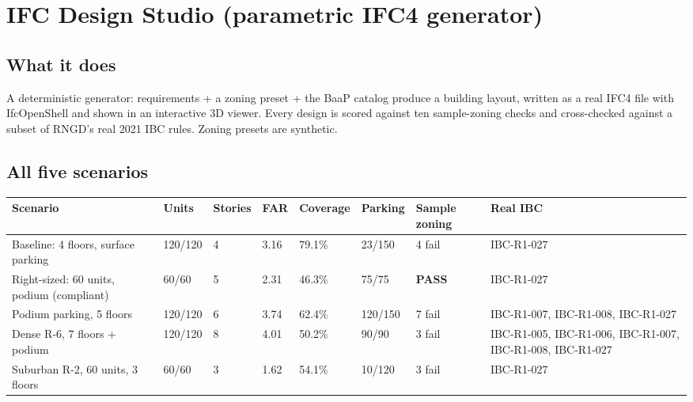 \documentclass[10pt]{article}
\begin{document}
\section{IFC Design Studio (parametric IFC4 generator)}
\subsection{What it does}
A deterministic generator: requirements + a zoning preset + the BaaP catalog produce a building layout, written as a
real IFC4 file with IfcOpenShell and shown in an interactive 3D viewer. Every design is scored against ten
sample-zoning checks and cross-checked against a subset of RNGD's real 2021 IBC rules. Zoning presets are synthetic.

\subsection{All five scenarios}
{\small \begin{longtable}{p{4.4cm}p{1.2cm}p{1.0cm}p{0.8cm}p{1.3cm}p{1.4cm}p{1.8cm}p{2.6cm}}
\toprule
\textbf{Scenario} & \textbf{Units} & \textbf{Stories} & \textbf{FAR} & \textbf{Coverage} & \textbf{Parking} & \textbf{Sample zoning} & \textbf{Real IBC} \\ \midrule \endhead
Baseline: 4 floors, surface parking & 120/120 & 4 & 3.16 & 79.1\% & 23/150 & \textcolor{fail}{4 fail} & \textcolor{fail}{IBC-R1-027} \\
Right-sized: 60 units, podium (compliant) & 60/60 & 5 & 2.31 & 46.3\% & 75/75 & \textcolor{pass}{\textbf{PASS}} & \textcolor{fail}{IBC-R1-027} \\
Podium parking, 5 floors & 120/120 & 6 & 3.74 & 62.4\% & 120/150 & \textcolor{fail}{7 fail} & \textcolor{fail}{IBC-R1-007, IBC-R1-008, IBC-R1-027} \\
Dense R-6, 7 floors + podium & 120/120 & 8 & 4.01 & 50.2\% & 90/90 & \textcolor{fail}{3 fail} & \textcolor{fail}{IBC-R1-005, IBC-R1-006, IBC-R1-007, IBC-R1-008, IBC-R1-027} \\
Suburban R-2, 60 units, 3 floors & 60/60 & 3 & 1.62 & 54.1\% & 10/120 & \textcolor{fail}{3 fail} & \textcolor{fail}{IBC-R1-027} \\
\bottomrule
\end{longtable}}
\end{document}
